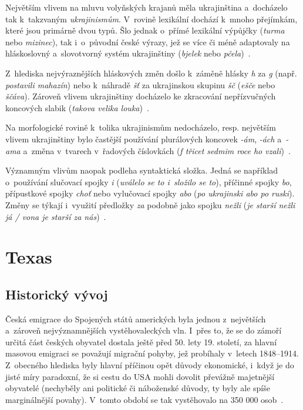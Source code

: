 Největším vlivem na mluvu volyňských krajanů měla ukrajinština a~docházelo tak k~takzvaným \emph{ukrajinismům}. V~rovině lexikální dochází k~mnoho přejímkám, které jsou primárně dvou typů. Šlo jednak o~přímé lexikální výpůjčky (\emph{turma} nebo \emph{mizinec}), tak i~o~původní české výrazy, jež se více či méně adaptovaly na hláskoslovný a~slovotvorný systém ukrajinštiny (\emph{bjelek} nebo \emph{pčela})~\parencite{Balhar2005}.

Z~hlediska nejvýraznějších hláskových změn došlo k~záměně hlásky \emph{h} za \emph{g} (např. \emph{postavili mahazín}) nebo k~náhradě \emph{šť} za ukrajinskou skupinu \emph{šč} (\emph{ešče} nebo \emph{ščáva}). Zároveň vlivem ukrajinštiny docházelo ke zkracování nepřízvučných koncových slabik (\emph{takova velika louka})~\parencite{Jancakova2004}.

Na morfologické rovině k~tolika ukrajinismům nedocházelo, resp. největším vlivem ukrajinštiny bylo častější používání plurálových koncovek \emph{-ám}, \emph{-ách} a~\emph{-ama} a~změna v~tvarech v~řadových číslovkách (\emph{f třicet sedmim roce ho vzali})~\parencite{Jancakova2004}.

Významným vlivům naopak podleha syntaktická složka. Jedná se například o~používání slučovací spojky \emph{i} (\emph{uválelo se to i~složilo se to}), příčinné spojky \emph{bo}, přípustkové spojky \emph{choť} nebo vylučovací spojky \emph{abo} (\emph{po ukrajinski abo po ruski}). Změny se týkají i~využití předložky \emph{za} podobně jako spojku \emph{nežli} (\emph{je starší nežli já / vona je starší za nás})~\parencite{Balhar2005}.

\hypertarget{texas}{%
\section{Texas}\label{texas}}

\hypertarget{historickuxfd-vuxfdvoj-2}{%
\subsection*{Historický vývoj}\label{historickuxfd-vuxfdvoj-2}}

Česká emigrace do Spojených států amerických byla jednou z~největších a~zároveň nejvýznamnějších vystěhovaleckých vln. I~přes to, že se do zámoří určitá část českých obyvatel dostala ještě před 50. lety 19. století, za hlavní masovou emigraci se považují migrační pohyby, jež probíhaly v~letech 1848--1914. Z~obecného hlediska byly hlavní příčinou opět důvody ekonomické, i~když je do jisté míry paradoxní, že si cestu do USA mohli dovolit převážně majetnější obyvatelé (nechyběly ani politické či náboženské důvody, ty byly ale spíše marginálnější povahy). V~tomto období se tak vystěhovalo na 350 000 osob~\parencite{Vaculik2009a}.

